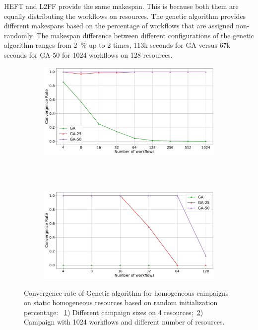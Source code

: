 HEFT and L2FF provide the same makespan.
This is because both them are equally distributing the workflows on resources.
The genetic algorithm provides different makespans based on the percentage of workflows that are assigned non-randomly.
The makespan difference between different configurations of the genetic algorithm  ranges from 2~\% up to 2 times, 113k seconds for GA versus 67k seconds for GA-50 for 1024 workflows on 128 resources.

\begin{figure}[ht!]
    \centering
    \begin{subfigure}[b]{0.85\textwidth}
        \includegraphics[width=.95\textwidth]{figures/campaign/StHomoCampaigns_4StHomoResourcesGAconv.pdf}
        \caption{}
        \label{fig:ga_conv1}
    \end{subfigure}\\
    ~ 
    \begin{subfigure}[b]{0.85\textwidth}
        \includegraphics[width=.95\textwidth]{figures/campaign/HomogeResources_StHomogeCampaignsGAconv.pdf}
        \caption{}
        \label{fig:ga_conv2}
    \end{subfigure}
    \caption{Convergence rate of Genetic algorithm for homogeneous campaigns on static homogeneous resources based on random initialization percentage: ~\ref{fig:ga_conv1}) Different campaign sizes on 4 resources;~\ref{fig:ga_conv2}) Campaign with 1024 workflows and different number of resources.}
    \label{fig:conv_rate}
\end{figure}

